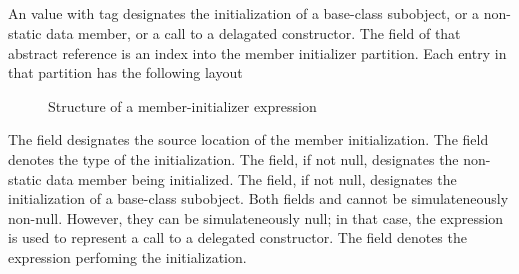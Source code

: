 
\subsection{}
\label{sec:ifc:ExprSort:MemberInitializer}

An  value with tag  designates the initialization of 
a base-class subobject, or a non-static data member, or a call to a delagated constructor.  The 
field of that abstract reference is an index into the member initializer partition.  Each entry in that
partition has the following layout 
%
\begin{figure}[H]
	\centering
	\caption{Structure of a member-initializer expression}
	\label{fig:ifc-member-initializer-expression-structure}
\end{figure}
%
The  field designates the source location of the member initialization.
The  field denotes the type of the initialization.
The  field, if not null, designates the non-static data member being initialized.
The  field, if not null, designates the initialization of a base-class subobject.
Both fields  and  cannot be simulateneously non-null.
However, they can be simulateneously null; in that case, the expression is used
to represent a call to a delegated constructor.
The  field denotes the expression perfoming the initialization.




\subsection{}
\label{sec:ifc:ExprSort:MemberAccess}

